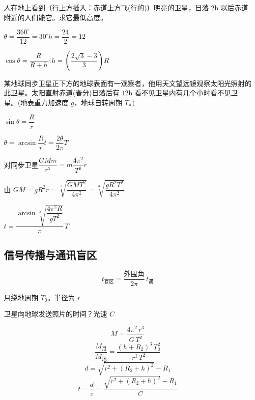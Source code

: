 \begin{problem}[5.]

人在地上看到（行上方插入：赤道上方飞(行的)）明亮的卫星，日落 $2\mathrm{h}$ 以后赤道附近的人们能它。求它最低高度。
\begin{solution}
$\theta=\dfrac{360^\circ}{12}=30^\circ$\quad $h=\dfrac{24}{2}=12$

$\cos\theta=\dfrac{R}{R+h}$\quad $\therefore h=\left(\dfrac{2\sqrt{3}-3}{3}\right)R$
\end{solution}
\end{problem}

\begin{problem}

某地球同步卫星正下方的地球表面有一观察者，他用天文望远镜观察太阳光照射的此卫星。太阳直射赤道(春分)日落后有 $12\mathrm{h}$ 看不见卫星内有几个小时看不见卫星。(地表重力加速度 $g$，地球自转周期 $T$。)%
\begin{solution}
$\sin\theta=\dfrac{R}{r}$\quad \struck{$\theta$}%

$\theta=\arcsin\dfrac{R}{r}$\quad $t=\dfrac{2\theta}{2\pi}T$

对同步卫星\quad $\dfrac{GMm}{r^2}=m\dfrac{4\pi^2}{T^2}r$

由 $GM=gR^2$\quad $r=\sqrt[3]{\dfrac{GMT^2}{4\pi^2}}=\sqrt[3]{\dfrac{gR^2T^2}{4\pi^2}}$

$t=\dfrac{\arcsin\sqrt[3]{\dfrac{4\pi^2R}{gT^2}}}{\pi}\,T$%
\end{solution}
\end{problem}

\subsection{信号传播与通讯盲区}
\[ t_{\text{盲区}}=\dfrac{\text{外围角}}{2\pi}\,t_{\text{遇}} \]

\begin{problem}[4.]

月绕地周期 $T_0$。半径为 $r$

卫星向地球发送照片的时间？光速 $C$
\begin{solution}
\[ M=\frac{4\pi^2\,r^3}{G\,T^2} \]%
\[ \frac{M_{\text{月}}}{M_{\text{地}}}=\frac{(h+R_2)^3\,T_0^2}{r^3\,T^2} \]
\[ d=\sqrt{r^2+(R_2+h)^2}-R_1 \]
\[ t=\frac{d}{c}=\frac{\sqrt{r^2+(R_2+h)^2}-R_1}{C} \]
\end{solution}
\end{problem}

